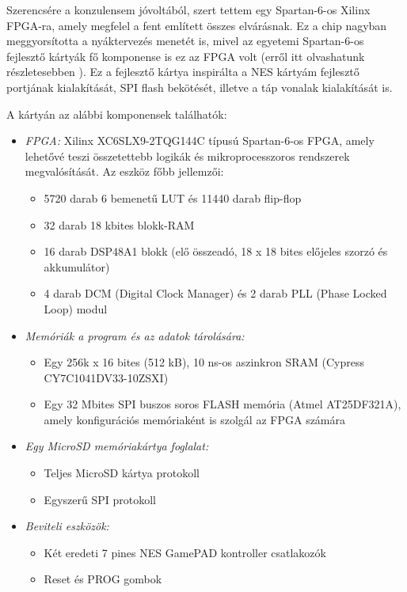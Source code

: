 Szerencsére a konzulensem jóvoltából, szert tettem egy Spartan-6-os Xilinx FPGA-ra, amely megfelel a fent említett összes elvárásnak. Ez a chip nagyban meggyorsította a nyáktervezés menetét is, mivel az egyetemi Spartan-6-os fejlesztő kártyák fő komponense is ez az FPGA volt (erről itt olvashatunk részletesebben \cite{spatan6}). Ez a fejlesztő kártya inspirálta a NES kártyám fejlesztő portjának kialakítását, SPI flash bekötését, illetve a táp vonalak kialakítását is. 
	
A kártyán az alábbi komponensek találhatók:

\begin{itemize}
	\item \emph{FPGA:} Xilinx XC6SLX9-2TQG144C típusú Spartan-6-os FPGA, amely lehetővé teszi összetettebb logikák és
	mikroprocesszoros rendszerek megvalósítását. Az eszköz főbb jellemzői:
		\begin{itemize}
			\item 5720 darab 6 bemenetű LUT és 11440 darab flip-flop
			\item 32 darab 18 kbites blokk-RAM
			\item 16 darab DSP48A1 blokk (elő összeadó, 18 x 18 bites előjeles szorzó és akkumulátor)
			\item 4 darab DCM (Digital Clock Manager) és 2 darab PLL (Phase Locked Loop) modul
		\end{itemize} 
	\item \emph{Memóriák a program és az adatok tárolására:}
		\begin{itemize}
			\item Egy 256k x 16 bites (512 kB), 10 ns-os aszinkron SRAM (Cypress CY7C1041DV33-10ZSXI)
			\item Egy 32 Mbites SPI buszos soros FLASH memória (Atmel AT25DF321A), amely
			konfigurációs memóriaként is szolgál az FPGA számára
		\end{itemize}
	\item \emph{Egy MicroSD memóriakártya foglalat:}
		\begin{itemize}
			\item Teljes MicroSD kártya protokoll
			\item Egyszerű SPI protokoll
		\end{itemize}
	\item \emph{Beviteli eszközök:}
		\begin{itemize}
			\item Két eredeti 7 pines NES GamePAD kontroller csatlakozók
			\item Reset és PROG gombok

\end{itemize}
\end{itemize}
